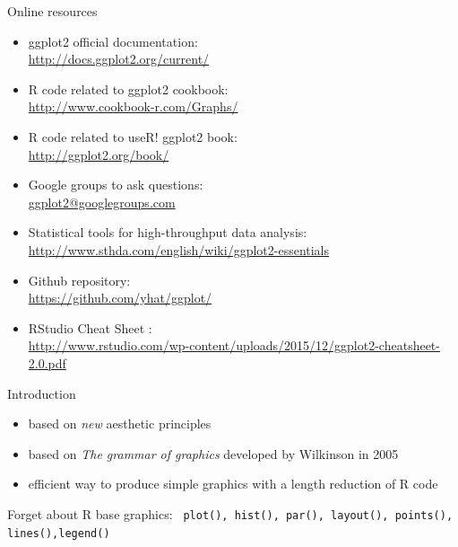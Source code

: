 \documentclass{beamer}\usepackage[]{graphicx}\usepackage[]{color}
\begin{document}
\begin{frame}{Online resources}
\begin{itemize}
\item ggplot2 official documentation:\\  \url{http://docs.ggplot2.org/current/}
\item R code related to ggplot2 cookbook:\\ \url{http://www.cookbook-r.com/Graphs/}
\item R code related to useR! ggplot2 book:\\ \url{http://ggplot2.org/book/}
\item Google groups to ask questions:\\ \url{ggplot2@googlegroups.com}
\item Statistical tools for high-throughput data analysis:\\ \url{http://www.sthda.com/english/wiki/ggplot2-essentials}
\item Github repository:\\ \url{https://github.com/yhat/ggplot/}
\item RStudio Cheat Sheet :\\ \url{http://www.rstudio.com/wp-content/uploads/2015/12/ggplot2-cheatsheet-2.0.pdf}
\end{itemize}
\end{frame}


\begin{frame}{Introduction}
\begin{itemize}
\item based on \textit{new} aesthetic principles
\item based on \textit{The grammar of graphics} developed by Wilkinson in 2005
\item efficient way to produce simple graphics with a length reduction of R code
\end{itemize}

\begin{alertblock}{Forget about R base graphics:}
\texttt{ plot(), hist(), par(), layout(), points(), lines(),legend()}
\end{alertblock}
\end{frame}
\end{document}
